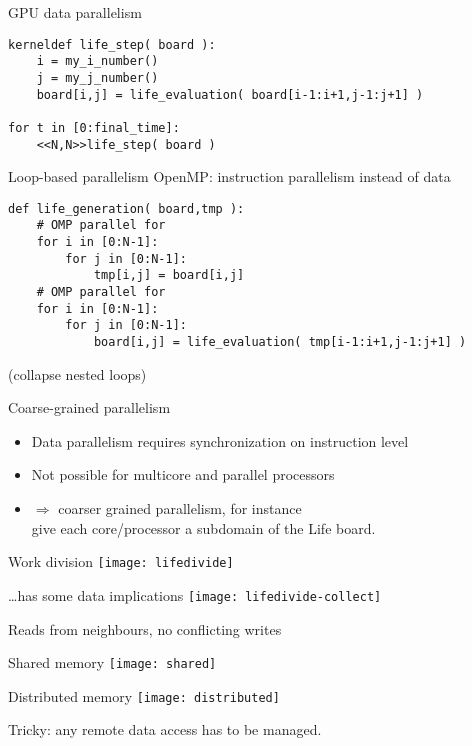 \begin{frame}[fragile]{GPU data parallelism}
\begin{verbatim}
kerneldef life_step( board ):
    i = my_i_number()
    j = my_j_number()
    board[i,j] = life_evaluation( board[i-1:i+1,j-1:j+1] )

for t in [0:final_time]:
    <<N,N>>life_step( board )
\end{verbatim}
\end{frame}

\begin{frame}[fragile]{Loop-based parallelism}
OpenMP: instruction parallelism instead of data
\small
\begin{verbatim}
def life_generation( board,tmp ):
    # OMP parallel for
    for i in [0:N-1]:
        for j in [0:N-1]:
            tmp[i,j] = board[i,j]
    # OMP parallel for
    for i in [0:N-1]:
        for j in [0:N-1]:
            board[i,j] = life_evaluation( tmp[i-1:i+1,j-1:j+1] )
\end{verbatim}
(collapse nested loops)
\end{frame}

\begin{frame}{Coarse-grained parallelism}
  \begin{itemize}
  \item Data parallelism requires synchronization on instruction level
  \item Not possible for multicore and parallel processors
  \item $\Rightarrow$ coarser grained parallelism, for instance\\
    give each core/processor a subdomain of the Life board.
  \end{itemize}
\end{frame}

\begin{frame}{Work division}
  \texttt{[image: lifedivide]}
\end{frame}

\begin{frame}{\ldots has some data implications}
  \texttt{[image: lifedivide-collect]}

  Reads from neighbours, no conflicting writes
\end{frame}

\begin{frame}{Shared memory}
  \texttt{[image: shared]}
\end{frame}

\begin{frame}{Distributed memory}
  \texttt{[image: distributed]}

  Tricky: any remote data access has to be managed.
\end{frame}

